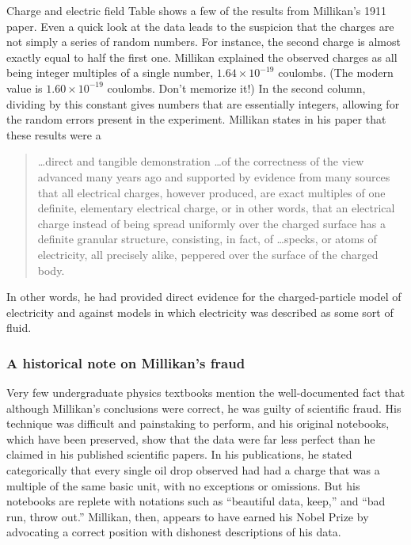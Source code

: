 \begin{envsubsection}{Charge and electric field}
	Table  shows a few of the results from
	Millikan's 1911 paper. 
	Even a quick look at the
	data leads to the suspicion that the charges are not simply
	a series of random numbers. For instance, the second charge
	is almost exactly equal to half the first one. Millikan
	explained the observed charges as all being integer
	multiples of a single number, $1.64\times10^{-19}$ coulombs.
	(The modern value is $1.60\times10^{-19}$ coulombs. Don't memorize it!) In the
	second column, dividing by this constant gives numbers that
	are essentially integers, allowing for the random errors
	present in the experiment. Millikan states in his paper that
	these results were a

	\begin{quote}
	\ldots direct and tangible demonstration \ldots of the correctness of
	the view advanced many years ago and supported by evidence
	from many sources that all electrical charges, however
	produced, are exact multiples of one definite, elementary
	electrical charge, or in other words, that an electrical
	charge instead of being spread uniformly over the charged
	surface has a definite granular structure, consisting, in
	fact, of \ldots specks, or atoms of electricity, all precisely
	alike, peppered over the surface of the charged body.
	\end{quote}

	In other words, he had provided direct evidence for the
	charged-particle model of electricity and against models in
	which electricity was described as some sort of fluid. 

	\subsubsection{A historical note on Millikan's fraud}
	Very few undergraduate physics textbooks mention
	 the well-documented fact that although
	Millikan's conclusions were correct, he was guilty of scientific
	fraud. His technique was difficult and painstaking to perform, and his
	original notebooks, which have been preserved, show that the data were
	far less perfect than he claimed in his published scientific papers.
	In his publications, he stated categorically that every single oil
	drop observed had had a charge that was a multiple of the same basic unit, with no
	exceptions or omissions. But his notebooks are replete with notations
	such as ``beautiful data, keep,'' and ``bad run, throw out.'' Millikan,
	then, appears to have earned his Nobel Prize by advocating a correct
	position with dishonest descriptions of his data.
	

\end{envsubsection}
